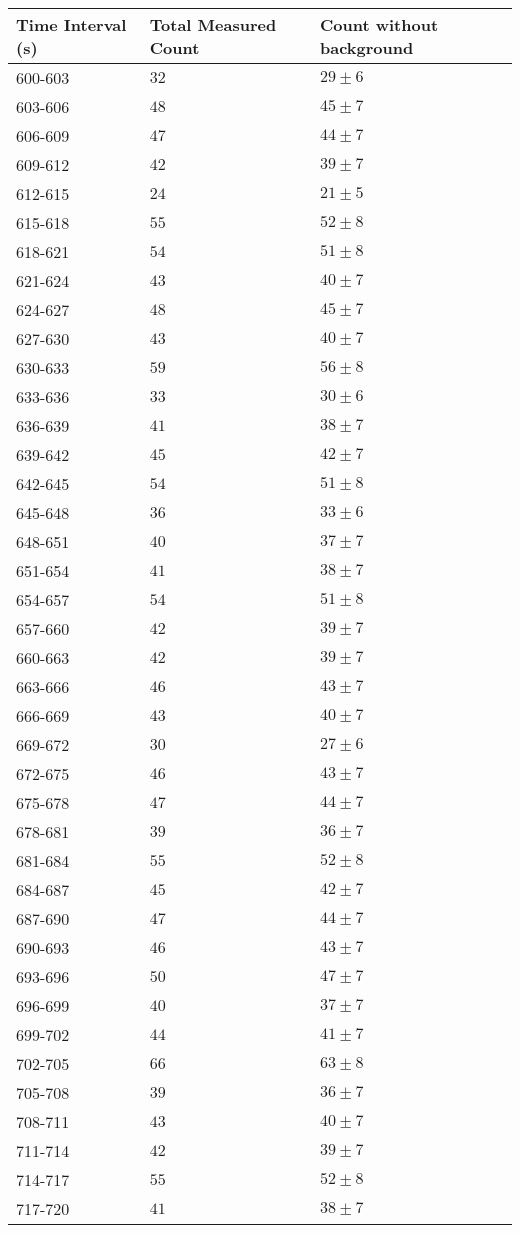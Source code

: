 \begin{tabular}{| p{} | p{} | p{} |}\hline
Time Interval (s) & Total Measured Count & Count without background\\
\hline
600-603 & $32$ & $29\pm 6$\\
603-606 & $48$ & $45\pm 7$\\
606-609 & $47$ & $44\pm 7$\\
609-612 & $42$ & $39\pm 7$\\
612-615 & $24$ & $21\pm 5$\\
615-618 & $55$ & $52\pm 8$\\
618-621 & $54$ & $51\pm 8$\\
621-624 & $43$ & $40\pm 7$\\
624-627 & $48$ & $45\pm 7$\\
627-630 & $43$ & $40\pm 7$\\
630-633 & $59$ & $56\pm 8$\\
633-636 & $33$ & $30\pm 6$\\
636-639 & $41$ & $38\pm 7$\\
639-642 & $45$ & $42\pm 7$\\
642-645 & $54$ & $51\pm 8$\\
645-648 & $36$ & $33\pm 6$\\
648-651 & $40$ & $37\pm 7$\\
651-654 & $41$ & $38\pm 7$\\
654-657 & $54$ & $51\pm 8$\\
657-660 & $42$ & $39\pm 7$\\
660-663 & $42$ & $39\pm 7$\\
663-666 & $46$ & $43\pm 7$\\
666-669 & $43$ & $40\pm 7$\\
669-672 & $30$ & $27\pm 6$\\
672-675 & $46$ & $43\pm 7$\\
675-678 & $47$ & $44\pm 7$\\
678-681 & $39$ & $36\pm 7$\\
681-684 & $55$ & $52\pm 8$\\
684-687 & $45$ & $42\pm 7$\\
687-690 & $47$ & $44\pm 7$\\
690-693 & $46$ & $43\pm 7$\\
693-696 & $50$ & $47\pm 7$\\
696-699 & $40$ & $37\pm 7$\\
699-702 & $44$ & $41\pm 7$\\
702-705 & $66$ & $63\pm 8$\\
705-708 & $39$ & $36\pm 7$\\
708-711 & $43$ & $40\pm 7$\\
711-714 & $42$ & $39\pm 7$\\
714-717 & $55$ & $52\pm 8$\\
717-720 & $41$ & $38\pm 7$\\
\hline
\end{tabular}\\
